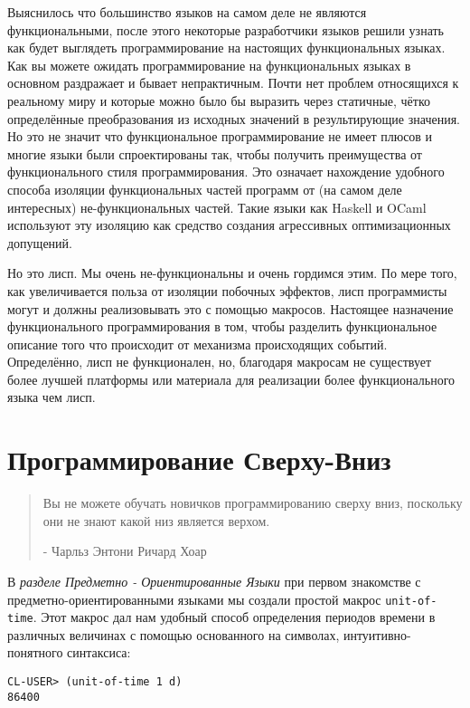Выяснилось что большинство языков на самом деле не являются функциональными, после этого некоторые разработчики языков решили узнать как будет выглядеть программирование на настоящих функциональных языках. Как вы можете ожидать программирование на функциональных языках в основном раздражает и бывает непрактичным. Почти нет проблем относящихся к реальному миру и которые можно было бы выразить через статичные, чётко определённые преобразования из исходных значений в результирующие значения. Но это не значит что функциональное программирование не имеет плюсов и многие языки были спроектированы так, чтобы получить преимущества от функционального стиля программирования. Это означает нахождение удобного способа изоляции функциональных частей программ от (на самом деле интересных) не-функциональных частей. Такие языки как Haskell и OCaml используют эту изоляцию как средство создания агрессивных оптимизационных допущений. 

Но это лисп. Мы очень не-функциональны и очень гордимся этим. По мере того, как увеличивается польза от изоляции побочных эффектов, лисп программисты могут и должны реализовывать это с помощью макросов. Настоящее назначение функционального программирования в том, чтобы разделить функциональное описание того что происходит от механизма происходящих событий. Определённо, лисп не функционален, но, благодаря макросам не существует более лучшей платформы или материала для реализации более функционального языка чем лисп.

\section{Программирование Сверху-Вниз}\label{section_top-down_programming}

\begin{quote}
Вы не можете обучать новичков программированию сверху вниз, поскольку они не знают какой низ является верхом.

- Чарльз Энтони Ричард Хоар
\end{quote}

В \emph{разделе Предметно - Ориентированные Языки} при первом знакомстве с предметно-ориентированными языками мы создали простой макрос \verb"unit-of-time". Этот макрос дал нам удобный способ определения периодов времени в различных величинах с помощью основанного на символах, интуитивно-понятного синтаксиса:

\begin{verbatim}
CL-USER> (unit-of-time 1 d)
86400
\end{verbatim}

